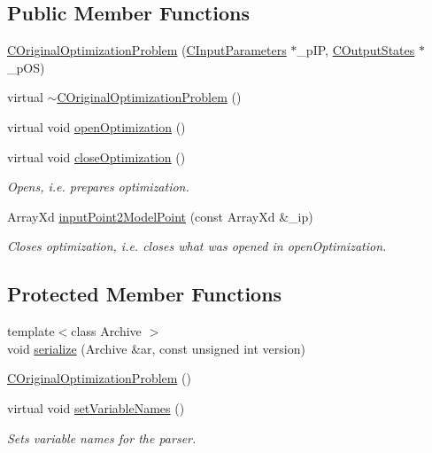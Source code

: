 \subsection*{Public Member Functions}
\begin{DoxyCompactItemize}
\item 
\hyperlink{class_go_s_u_m_1_1_c_original_optimization_problem_a3a7ca7ef6350e169b49d23a1f170413e}{C\-Original\-Optimization\-Problem} (\hyperlink{class_go_s_u_m_1_1_c_input_parameters}{C\-Input\-Parameters} $\ast$\-\_\-p\-I\-P, \hyperlink{class_go_s_u_m_1_1_c_output_states}{C\-Output\-States} $\ast$\-\_\-p\-O\-S)
\item 
virtual \hyperlink{class_go_s_u_m_1_1_c_original_optimization_problem_afd4e36fcf4757eccdcf0ce5d35a9f070}{$\sim$\-C\-Original\-Optimization\-Problem} ()
\item 
virtual void \hyperlink{class_go_s_u_m_1_1_c_original_optimization_problem_aa2473c8014cf051d66ecbe6107043b6a}{open\-Optimization} ()
\item 
virtual void \hyperlink{class_go_s_u_m_1_1_c_original_optimization_problem_a75b28528cda5b1be7bdc2cc4a309a314}{close\-Optimization} ()
\begin{DoxyCompactList}\small\item\em Opens, i.\-e. prepares optimization. \end{DoxyCompactList}\item 
Array\-Xd \hyperlink{class_go_s_u_m_1_1_c_original_optimization_problem_a3ad565122964e4fdec8156f6457c582e}{input\-Point2\-Model\-Point} (const Array\-Xd \&\-\_\-ip)
\begin{DoxyCompactList}\small\item\em Closes optimization, i.\-e. closes what was opened in open\-Optimization. \end{DoxyCompactList}\end{DoxyCompactItemize}
\subsection*{Protected Member Functions}
\begin{DoxyCompactItemize}
\item 
{\footnotesize template$<$class Archive $>$ }\\void \hyperlink{class_go_s_u_m_1_1_c_original_optimization_problem_a41f4a21189b39fcdb0d820d2f8348475}{serialize} (Archive \&ar, const unsigned int version)
\item 
\hyperlink{class_go_s_u_m_1_1_c_original_optimization_problem_a6df1f069274ee592d945be3427e0e49a}{C\-Original\-Optimization\-Problem} ()
\item 
virtual void \hyperlink{class_go_s_u_m_1_1_c_original_optimization_problem_aabc85a11abb23fdfe5b99f8d141ae4bb}{set\-Variable\-Names} ()
\begin{DoxyCompactList}\small\item\em Sets variable names for the parser. \end{DoxyCompactList}\end{DoxyCompactItemize}
